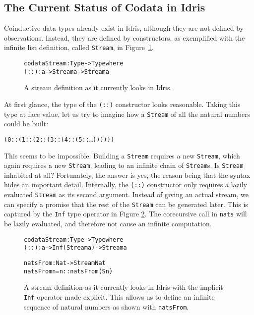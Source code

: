 \subsection{The Current Status of Codata in Idris}
\label{sec:stateinidris}
Coinductive data types already exist in Idris, although they are not defined by observations. Instead, they are defined by constructors, as exemplified with the infinite list definition, called \texttt{Stream}, in Figure~\ref{fig:stream_current}.

\begin{figure}
\begin{alltt}
codata Stream : Type -> Type where
  (::) : a -> Stream a -> Stream a
\end{alltt}
\caption{A stream definition as it currently looks in Idris.}
\label{fig:stream_current}
\end{figure}

At first glance, the type of the \texttt{(::)} constructor looks reasonable. Taking this type at face value, let us try to imagine how a \texttt{Stream} of all the natural numbers could be built:

\begin{alltt}
(0 :: (1 :: (2 :: (3 :: (4 :: (5 :: \ldots))))))
\end{alltt}

This seems to be impossible. Building a \texttt{Stream} requires a new \texttt{Stream}, which again requires a new \texttt{Stream}, leading to an infinite chain of \texttt{Stream}s. Is \texttt{Stream} inhabited at all? Fortunately, the answer is yes, the reason being that the syntax hides an important detail. Internally, the \texttt{(::)} constructor only requires a lazily evaluated \texttt{Stream} as its second argument. Instead of giving an actual stream, we can specify a promise that the rest of the \texttt{Stream} can be generated later. This is captured by the \texttt{Inf} type operator in Figure \ref{fig:stream_current_Inf_and_natsFrom}. The corecursive call in \texttt{nats} will be lazily evaluated, and therefore not cause an infinite computation.

\begin{figure}
\begin{alltt}
codata Stream : Type -> Type where
  (::) : a -> Inf (Stream a) -> Stream a

natsFrom : Nat -> Stream Nat
natsFrom n = n :: natsFrom (S n)
\end{alltt}
\caption{A stream definition as it currently looks in Idris with the implicit \texttt{Inf} operator made explicit. This allows us to define an infinite sequence of natural numbers as shown with \texttt{natsFrom}.}
\label{fig:stream_current_Inf_and_natsFrom}
\end{figure}

